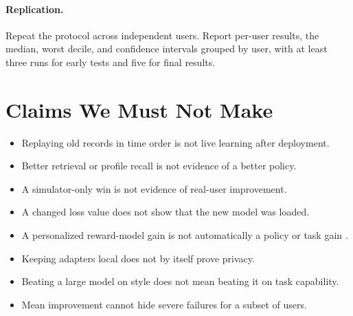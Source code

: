 \documentclass[11pt]{article}
\begin{document}
\paragraph{Replication.}
Repeat the protocol across independent users.  Report per-user results, the
median, worst decile, and confidence intervals grouped by user, with at least
three runs for early tests and five for final results.

\section{Claims We Must Not Make}
\label{sec:nonclaims}

\begin{itemize}
  \item Replaying old records in time order is not live learning after
  deployment.
  \item Better retrieval or profile recall is not evidence of a better policy.
  \item A simulator-only win is not evidence of real-user improvement.
  \item A changed loss value does not show that the new model was loaded.
  \item A personalized reward-model gain is not automatically a policy or task
  gain \citep{rezk2025rmcrisis}.
  \item Keeping adapters local does not by itself prove privacy.
  \item Beating a large model on style does not mean beating it on task
  capability.
  \item Mean improvement cannot hide severe failures for a subset of users.
\end{itemize}



\end{document}
